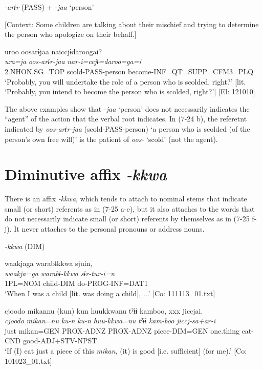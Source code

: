 \ex \label{ex:7:24b}\textit{{}-arɨr} (PASS) + \textit{{}-jaa} ‘person’

    [Context: Some children are talking about their mischief and trying to determine the person who apologize on their behalf.]

\glll  uroo  oosarɨjaa  naiccjɨdaroogai?\\
\textit{ura=ja}  \textit{oos-arɨr-jaa}  \textit{nar-i=ccjɨ=daroo=ga=i}\\
2.NHON.SG=TOP  scold-PASS-person  become-INF=QT=SUPP=CFM3=PLQ\\
\glt ‘Probably, you will undertake the role of a person who is scolded, right?’ [lit. ‘Probably, you intend to become the person who is scolded, right?’] [El: 121010]
\z
\z

The above examples show that \textit{{}-jaa} ‘person’ does not necessarily indicates the “agent” of the action that the verbal root indicates. In (7-24 b), the referetnt indicated by \textit{oos-arɨr-jaa} (scold-PASS-person) ‘a person who is scolded (of the person’s own free will)’ is the patient of \textit{oos-} ‘scold’ (not the agent).

\section{Diminutive affix \textit{{}-kkwa}}

There is an affix \textit{{}-kkwa}, which tends to attach to nominal stems that indicate small (or short) referents as in (7-25 a-e), but it also attaches to the words that do not necessarily indicate small (or short) referents by themselves as in (7-25 f-j). It never attaches to the personal pronouns or address nouns.

\ea \label{ex:7:25}  \textit{{}-kkwa} (DIM)

\ea \label{ex:7:25a}%
\glll  waakjaga  warabɨkkwa  sjuin,\\
\textit{waakja=ga}  \textit{warabɨ-kkwa}  \textit{sɨr-tur-i=n}\\
1PL=NOM  child-DIM  do-PROG-INF=DAT1\\
\glt ‘When I was a child [lit. was doing a child], ...’ [Co: 111113\_01.txt]

\ex \label{ex:7:25b}%
\glll  {\textbar}cjoodo  mikan{\textbar}nu  (kun)  kun  huukkwanu  tˀɨɨ  kamboo,  xxx  jiccjai.\\
\textit{cjoodo}  \textit{mikan=nu}  \textit{ku-n}  \textit{ku-n}  \textit{huu-kkwa=nu} \textit{tˀɨɨ}  \textit{kam-boo}    \textit{jiccj-sa+ar-i}\\
just  mikan=GEN  PROX-ADNZ  PROX-ADNZ  piece-DIM=GEN  one.thing  eat-CND    good-ADJ+STV-NPST\\
\glt ‘If (I) eat just a piece of this \textit{mikan}, (it) is good [i.e. sufficient] (for me).’ [Co: 101023\_01.txt]

